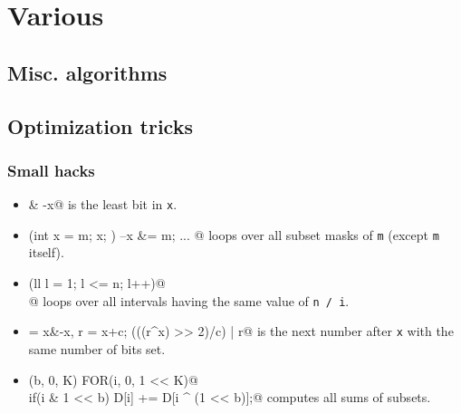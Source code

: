 \chapter{Various}

\section{Misc. algorithms}

\section{Optimization tricks}
	\subsection{Small hacks}
		\begin{itemize}
			\item \verb@x & -x@ is the least bit in \texttt{x}.
			\item \verb@for(int x = m; x; ) { --x &= m; ... }@ loops over all subset masks of \texttt{m} (except \texttt{m} itself).
			\item \verb@for(ll l = 1; l <= n; l++)@ \\ @ loops over all intervals having the same value of \texttt{n / i}.
			\item \verb@c = x&-x, r = x+c; (((r^x) >> 2)/c) | r@ is the next number after \texttt{x} with the same number of bits set.
			\item \verb@FOR(b, 0, K) FOR(i, 0, 1 << K)@ \\ \verb@  if(i & 1 << b) D[i] += D[i ^ (1 << b)];@ computes all sums of subsets.
		\end{itemize}
